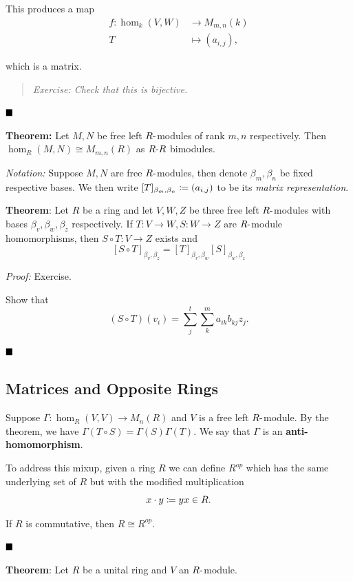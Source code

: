 This produces a map \begin{align*}
f: \hom_k(V, W) &\to M_{m, n}(k) \\
T &\mapsto (a_{i, j})
,\end{align*}

which is a matrix.

\begin{quote}
\emph{Exercise: Check that this is bijective.}
\end{quote}

\(\qed\)

\textbf{Theorem:} Let \(M, N\) be free left \(R{\hbox{-}}\)modules of rank
\(m, n\) respectively. Then \(\hom_R(M, N) \cong M_{m, n}(R)\) as
\(R{\hbox{-}} R\) bimodules.

\emph{Notation:} Suppose \(M, N\) are free \(R{\hbox{-}}\)modules, then
denote \(\beta_m, \beta_n\) be fixed respective bases. We then write
\([T]_{\beta_m, \beta_n} \coloneqq (a_{i, j})\) to be its \emph{matrix
representation}.

\textbf{Theorem}: Let \(R\) be a ring and let \(V, W, Z\) be three free
left \(R{\hbox{-}}\)modules with bases \(\beta_v, \beta_w, \beta_z\)
respectively. If \(T: V \to W, S: W\to Z\) are \(R{\hbox{-}}\)module
homomorphisms, then \(S \circ T: V \to Z\) exists and \[
[S \circ T]_{\beta_v, \beta_z} = [T]_{\beta_v, \beta_w} [S]_{\beta_w, \beta_z}
\]

\emph{Proof:} Exercise.

Show that \[
(S \circ T)(v_i) = \sum_j^t \sum_k^m a_{ik} b_{kj} z_j
.\]

\(\qed\)

\hypertarget{matrices-and-opposite-rings}{%
\subsection{Matrices and Opposite
Rings}\label{matrices-and-opposite-rings}}

Suppose \(\Gamma: \hom_R(V, V) \to M_n(R)\) and \(V\) is a free left
\(R{\hbox{-}}\)module. By the theorem, we have
\(\Gamma(T \circ S) = \Gamma(S) \Gamma(T)\). We say that \(\Gamma\) is
an \textbf{anti-homomorphism}.

To address this mixup, given a ring \(R\) we can define \(R^{op}\) which
has the same underlying set of \(R\) but with the modified
multiplication \[
x \cdot y \coloneqq yx \in R
.\]

If \(R\) is commutative, then \(R \cong R^{op}\).

\(\qed\)

\textbf{Theorem}: Let \(R\) be a unital ring and \(V\) an
\(R{\hbox{-}}\)module.

